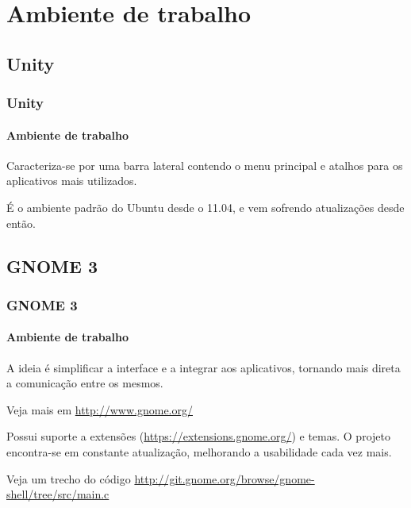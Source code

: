 \section{Ambiente de trabalho}

\begin{frame}


\end{frame}


\subsection{Unity}

\begin{frame}


\end{frame}

\begin{frame}\frametitle{Unity}\framesubtitle{Ambiente de trabalho}

Caracteriza-se por uma barra lateral contendo o menu principal e atalhos para os aplicativos
mais utilizados.

\medskip

É o ambiente padrão do Ubuntu desde o 11.04, e vem sofrendo atualizações desde então.

\end{frame}

\subsection{GNOME 3}

\begin{frame}


\end{frame}

\begin{frame}\frametitle{GNOME 3}\framesubtitle{Ambiente de trabalho}

A ideia é simplificar a interface e a integrar aos aplicativos, tornando mais direta
a comunicação entre os mesmos.

\medskip

Veja mais em \url{http://www.gnome.org/}

\medskip

Possui suporte a extensões (\url{https://extensions.gnome.org/}) e temas.
O projeto encontra-se em constante atualização, melhorando a usabilidade cada vez mais.

\medskip

Veja um trecho do código \url{http://git.gnome.org/browse/gnome-shell/tree/src/main.c}

\end{frame}

